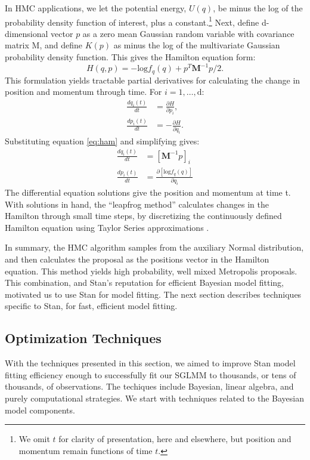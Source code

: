 In HMC applications, we let the potential energy, $U(q)$, be minus the log of the probability density function of interest, plus a constant.\footnote{We omit $t$ for clarity of presentation, here and elsewhere, but position and momentum remain functions of time $t$.} Next, define d-dimensional vector $p$ as a zero mean Gaussian random variable with covariance matrix M, and define $K(p)$ as minus the log of the multivariate Gaussian probability density function. This gives the Hamilton equation form:
\begin{equation} \label{eq:ham}
H(q,p) = -\text{log}f_{q}(q) + p^{T}\pmb{M}^{-1}p/2.
\end{equation}
This formulation yields tractable partial derivatives for calculating the change in position and momentum through time. For $i = 1,\dots, \text{d}$:
\begin{align}
\frac{d q_{i}(t)}{dt} &= \frac{\partial H}{\partial p_{i}}, \\
\frac{d p_{i}(t)}{dt} &= -\frac{\partial H}{\partial q_{i}}.
\end{align}
Substituting equation \ref{eq:ham} and simplifying gives:
\begin{align}
\frac{d q_{i}(t)}{dt} &=  [\pmb{M}^{-1}p]_{i} \\
\frac{d p_{i}(t)}{dt} &= \frac {\partial \left[ \text{log}f_{q}(q) \right]}{\partial q_{i}}
\end{align}
The differential equation solutions give the position and momentum at time t. With solutions in hand, the ``leapfrog method'' calculates changes in the Hamilton through small time steps, by discretizing the continuously defined Hamilton equation using Taylor Series approximations \citep{Neal2011}. 

In summary, the HMC algorithm samples from the auxiliary Normal distribution, and then calculates the proposal as the positions vector in the Hamilton equation. This method yields high probability, well mixed Metropolis proposals. This combination, and Stan's reputation for efficient Bayesian model fitting, motivated us to use Stan for model fitting. The next section describes techniques specific to Stan, for fast, efficient model fitting. 

\subsection{Optimization Techniques} %
With the techniques presented in this section, we aimed to improve Stan model fitting efficiency enough to successfully fit our SGLMM to thousands, or tens of thousands, of observations. The techiques include Bayesian, linear algebra, and purely computational strategies. We start with techniques related to the Bayesian model components.


